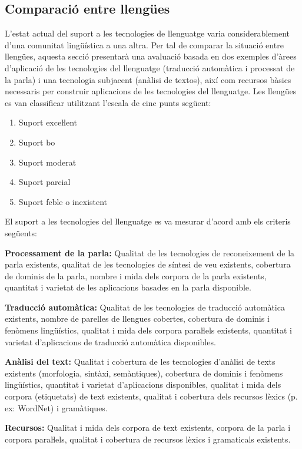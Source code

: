 \documentclass[]{../../metanetpaper}
\begin{document}
\begin{multicols}{2}
\subsection{Comparació entre llengües}

L'estat actual del suport a les tecnologies de llenguatge varia considerablement d'una comunitat lingüística a una altra. Per tal de comparar la situació entre llengües, aquesta secció presentarà una avaluació basada en dos exemples d'àrees d'aplicació de les tecnologies del llenguatge (traducció automàtica i processat de la parla) i una tecnologia subjacent (anàlisi de textos), així com recursos bàsics necessaris per construir aplicacions de les tecnologies del llenguatge.
Les llengües es van classificar utilitzant l'escala de cinc punts següent:

\begin{enumerate}
\item Suport exceŀlent
\item Suport bo
\item Suport moderat
\item Suport parcial
\item Suport feble o inexistent
\end{enumerate}

El suport a les tecnologies del llenguatge es va mesurar d'acord amb els criteris següents:

\textbf{Processament de la parla:} Qualitat de les tecnologies de reconeixement de la parla existents, qualitat de les tecnologies de síntesi de veu  existents, cobertura de dominis de la parla, nombre i mida dels corpora de la parla existents, quantitat i varietat de les aplicacions basades en la parla disponible.

\textbf{Traducció automàtica:} Qualitat de les tecnologies de traducció automàtica existents, nombre de parelles de llengues cobertes, cobertura de dominis i fenòmens lingüístics, qualitat i mida dels corpora paraŀlels existents, quantitat i varietat d'aplicacions de traducció automàtica disponibles.

\textbf{Anàlisi del text:} Qualitat i cobertura de les tecnologies d'anàlisi de texts existents (morfologia, sintàxi, semàntiques), cobertura de dominis i fenòmens lingüístics, quantitat i varietat d'aplicacions disponibles, qualitat i mida dels corpora (etiquetats) de text existents, qualitat i cobertura dels recursos lèxics (p. ex: WordNet) i gramàtiques.

\textbf{Recursos:} Qualitat i mida dels corpora de text existents, corpora de la parla i corpora paraŀlels, qualitat i cobertura de recursos lèxics i gramaticals existents.


\end{multicols}
\end{document}
